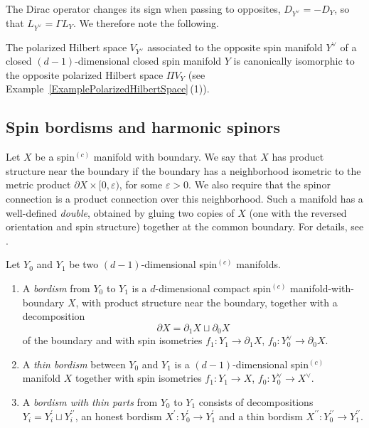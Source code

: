 \documentclass[10pt,a4paper]{amsart}
\numberwithin{equation}{section}
\begin{document}
The Dirac operator changes its sign when passing to opposites, $D_{Y^\vee} = - D_Y$, so that ${L_{Y^\vee} = \Gamma L_Y}$.
We therefore note the following.

\begin{Observation} \label{ObservationOppositeManifold}
The polarized Hilbert space $V_{Y^\vee}$ associated to the opposite spin manifold $Y^\vee$ of a closed $(d-1)$-dimensional closed spin manifold $Y$ is canonically isomorphic to the opposite polarized Hilbert space $\Pi V_Y$ (see Example~\ref{ExamplePolarizedHilbertSpace}\,(1)).
\end{Observation}

\subsection{Spin bordisms and harmonic spinors}

Let $X$ be a spin$^{(c)}$ manifold with boundary.
We say that $X$ has product structure near the boundary if the boundary has a neighborhood isometric to the metric product $\partial X \times [0, \varepsilon)$, for some $\varepsilon >0$.
We also require that the spinor connection is a product connection over this neighborhood.
Such a manifold has a well-defined \emph{double}, obtained by gluing two copies of $X$ (one with the reversed orientation and spin structure) together at the common boundary.
For details, see \cite[Section~I.9]{BBW}.

\begin{Definition}[bordisms]
Let $Y_0$ and $Y_1$ be two $(d-1)$-dimensional spin$^{(c)}$ manifolds.
\begin{enumerate}\itemsep=0pt
\item[(a)]
A \emph{bordism} from $Y_0$ to $Y_1$ is a $d$-dimensional compact spin$^{(c)}$ manifold-with-boundary $X$, with product structure near the boundary, together with a decomposition \[\partial X = \partial_1 X \sqcup \partial_0 X\] of the boundary and with spin isometries $f_1\colon Y_1 \to \partial_1 X$, $f_0\colon Y_0^\vee \to \partial_0 X$.
\item[(b)]
A \emph{thin bordism} between $Y_0$ and $Y_1$ is a $(d-1)$-dimensional spin$^{(c)}$ manifold $X$ together with spin isometries $f_1\colon Y_1 \to X$, $f_0\colon Y_0^\vee \to X^\vee$.
\item[(c)]
A \emph{bordism with thin parts} from $Y_0$ to $Y_1$ consists of decompositions $Y_i = Y_i^\prime \sqcup Y_i^{\prime\prime}$, an honest bordism $X^\prime\colon Y_0^\prime \to Y_1^\prime$ and a thin bordism $X^{\prime\prime}\colon Y_0^{\prime\prime} \to Y_1^{\prime\prime}$.
\end{enumerate}
\end{Definition}
\end{document}
